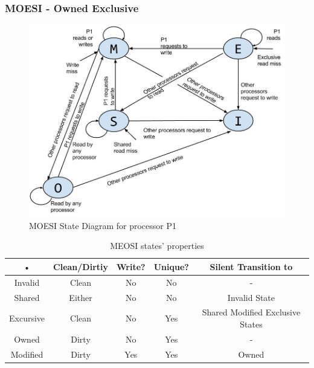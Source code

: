         \subsubsection{MOESI - Owned Exclusive}
        \begin{figure}[h!]
            \centering
            \includegraphics[width=1\textwidth]{img/MOESIstatediagram.jpg}
            \caption{MOESI State Diagram for processor P1}
            \label{fig:MOESIstatediagram}
        \end{figure}

        \begin{table}[position specifier]
            \centering
            \begin{tabular}{|c|c|c|c|c|}
                \hline 
                • & Clean/Dirtiy & Write? & Unique? & Silent Transition to \\ 
                \hline 
                Invalid & Clean & No & No & - \\ 
                \hline 
                Shared & Either & No & No & Invalid State \\ 
                \hline 
                Excursive & Clean & No & Yes & Shared Modified Exclusive States \\ 
                \hline 
                Owned & Dirty & No & Yes & - \\ 
                \hline 
                Modified & Dirty & Yes & Yes & Owned \\ 
                \hline 
            \end{tabular} 
            \caption{MEOSI states' properties}
            \label{tab:MOSItable}
        \end{table}

